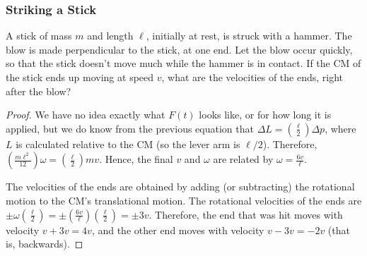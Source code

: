 \documentclass[11pt]{article}
\begin{document}
\subsubsection{Striking a Stick}
\begin{example}
    A stick of mass \(m\) and length \(\ell\), initially at rest, is struck with a hammer. The blow is made perpendicular to the stick, at one end. Let the blow occur quickly, so that the stick doesn’t move much while the hammer is in contact. If the CM of the stick ends up moving at speed \(v\), what are the velocities of the ends, right after the blow?
\end{example}
\begin{proof}
    We have no idea exactly what \(F(t)\) looks like, or for how long it is applied, but we do know from the previous equation that \(\Delta L = \left(\frac{\ell}{2}\right)\Delta p\), where \(L\) is calculated relative to the CM (so the lever arm is \(\ell/2\)). Therefore, \(\left(\frac{m\ell^2}{12}\right)\omega = \left(\frac{\ell}{2}\right)mv\). Hence, the final \(v\) and \(\omega\) are related by \(\omega = \frac{6v}{\ell}\).

    The velocities of the ends are obtained by adding (or subtracting) the
    rotational motion to the CM’s translational motion. The rotational velocities
    of the ends are \(\pm\omega\left(\frac{\ell}{2}\right) =
    \pm\left(\frac{6v}{\ell}\right)\left(\frac{\ell}{2}\right) = \pm3v\).
    Therefore, the end that was hit moves with velocity \(v + 3v = 4v\), and the
    other end moves with velocity \(v - 3v = -2v\) (that is, backwards).
\end{proof}

\end{document}
